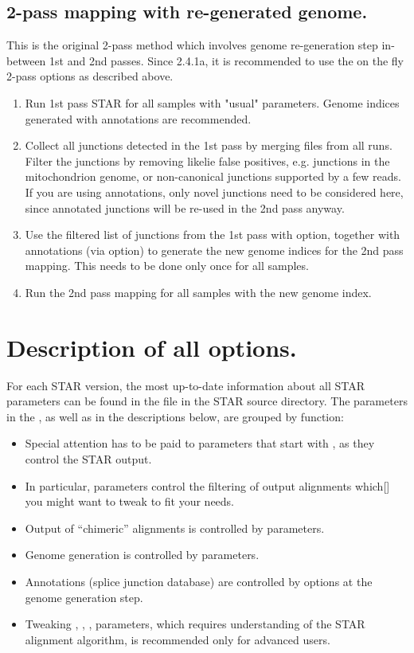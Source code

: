 \documentclass[12pt]{article}
\begin{document}
\subsection{2-pass mapping with re-generated genome.}
This is the original 2-pass method which involves genome re-generation step in-between 1st and 2nd passes. Since 2.4.1a, it is recommended to use the on the fly 2-pass options as described above.
\begin{enumerate}
\item Run 1st pass STAR for all samples with "usual" parameters. Genome indices generated with annotations are recommended.
\item Collect all junctions detected in the 1st pass by merging  files from all runs. Filter the junctions by removing likelie false positives, e.g. junctions in the mitochondrion genome, or non-canonical junctions supported by a few reads. If you are using annotations, only novel junctions need to be considered here, since annotated junctions will be re-used in the 2nd pass anyway.
\item Use the filtered list of junctions from the 1st pass with  option, together with annotations (via  option) to generate the new genome indices for the 2nd pass mapping. This needs to be done only once for all samples.
\item Run the 2nd pass mapping for all samples with the new genome index.
\end{enumerate}


\section{Description of all options.}\label{Description_of_all_options}
For each STAR version, the most up-to-date information about all STAR parameters can be found in the  file in the STAR source directory. The parameters in the , as well as in the descriptions below, are grouped by function:
\begin{itemize}
\item[] Special attention has to be paid to parameters that start with  , as they control the STAR output.
\item[] In particular,  parameters control the filtering of output alignments which[] you might want to tweak to fit your needs.
\item[] Output of “chimeric” alignments is controlled by  parameters.
\item[] Genome generation is controlled by  parameters.
\item[] Annotations (splice junction database) are controlled by  options at the genome generation step. 
\item[] Tweaking , ,  ,  parameters, which requires understanding of the STAR alignment algorithm, is recommended only for advanced users.
\end{itemize}
\end{document}

